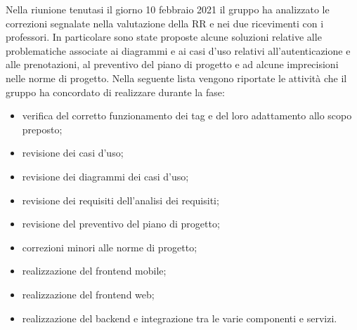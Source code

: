 Nella riunione tenutasi il giorno 10 febbraio 2021 il gruppo ha analizzato le correzioni segnalate nella valutazione della RR e nei due ricevimenti con i professori.
In particolare sono state proposte alcune soluzioni relative alle problematiche associate ai diagrammi e ai casi d'uso relativi all'autenticazione e alle prenotazioni, 
al preventivo del piano di progetto e ad alcune imprecisioni nelle norme di progetto. Nella seguente lista vengono riportate le attività che il gruppo ha concordato di 
realizzare durante la fase:

\begin{itemize}
	\item verifica del corretto funzionamento dei tag  e del loro adattamento allo scopo preposto;
	\item revisione dei casi d'uso; 
	\item revisione dei diagrammi dei casi d'uso;
	\item revisione dei requisiti dell'analisi dei requisiti;
	\item revisione del preventivo del piano di progetto;
	\item correzioni minori alle norme di progetto;
	\item realizzazione del frontend mobile;
	\item realizzazione del frontend web;
	\item realizzazione del backend e integrazione tra le varie componenti e servizi.
\end{itemize}
